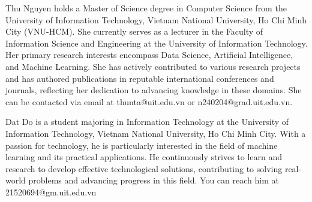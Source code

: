 \documentclass{ieeeaccess}
\begin{document}



\begin{IEEEbiography}{Thu Nguyen} holds a Master of Science degree in Computer Science from the University of Information Technology, Vietnam National University, Ho Chi Minh City (VNU-HCM). She currently serves as a lecturer in the Faculty of Information Science and Engineering at the University of Information Technology. Her primary research interests encompass Data Science, Artificial Intelligence, and Machine Learning. She has actively contributed to various research projects and has authored publications in reputable international conferences and journals, reflecting her dedication to advancing knowledge in these domains. She can be contacted via email at thunta@uit.edu.vn or n240204@grad.uit.edu.vn.
\end{IEEEbiography}

\begin{IEEEbiography}
{Dat Do} is a student majoring in Information Technology at the University of Information Technology, Vietnam National University, Ho Chi Minh City. With a passion for technology, he is particularly interested in the field of machine learning and its practical applications. He continuously strives to learn and research to develop effective technological solutions, contributing to solving real-world problems and advancing progress in this field. You can reach him at 21520694@gm.uit.edu.vn
\end{IEEEbiography}
\end{document}
